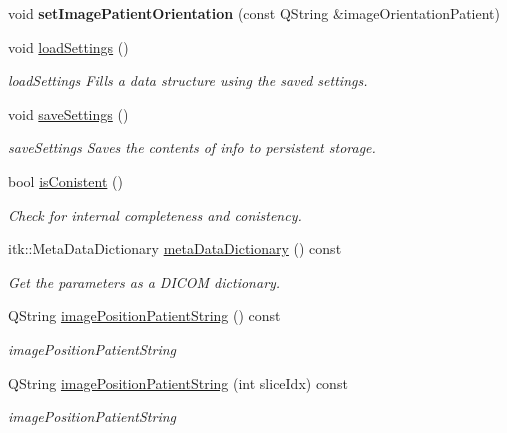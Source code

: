 \begin{DoxyCompactItemize}
void {\bfseries set\+Image\+Patient\+Orientation} (const Q\+String \&image\+Orientation\+Patient)
\item 
\mbox{\label{class_series_info_a32d3ea80ee92f8b5343032083c49329b}} 
void \hyperlink{class_series_info_a32d3ea80ee92f8b5343032083c49329b}{load\+Settings} ()
\begin{DoxyCompactList}\small\item\em load\+Settings Fills a data structure using the saved settings. \end{DoxyCompactList}\item 
\mbox{\label{class_series_info_a2227e5c01d043f356219e83cbe0384c0}} 
void \hyperlink{class_series_info_a2227e5c01d043f356219e83cbe0384c0}{save\+Settings} ()
\begin{DoxyCompactList}\small\item\em save\+Settings Saves the contents of info to persistent storage. \end{DoxyCompactList}\item 
bool \hyperlink{class_series_info_a3765099ab2658fa04ea0863f0b1e4b2b}{is\+Conistent} ()
\begin{DoxyCompactList}\small\item\em Check for internal completeness and conistency. \end{DoxyCompactList}\item 
itk\+::\+Meta\+Data\+Dictionary \hyperlink{class_series_info_a3855143383f2a9c6c66a05946e51d1f6}{meta\+Data\+Dictionary} () const
\begin{DoxyCompactList}\small\item\em Get the parameters as a D\+I\+C\+OM dictionary. \end{DoxyCompactList}\item 
Q\+String \hyperlink{class_series_info_ae0d61a82f9fe9caed2832478c2a2ed35}{image\+Position\+Patient\+String} () const
\begin{DoxyCompactList}\small\item\em image\+Position\+Patient\+String \end{DoxyCompactList}\item 
Q\+String \hyperlink{class_series_info_ae1484c1360ac3b7590eb938d8d5489ce}{image\+Position\+Patient\+String} (int slice\+Idx) const
\begin{DoxyCompactList}\small\item\em image\+Position\+Patient\+String \end{DoxyCompactList}\end{DoxyCompactItemize}

